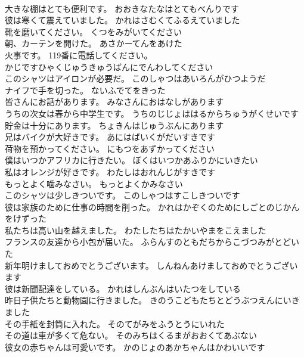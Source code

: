 \documentclass[8pt]{extreport}
\begin{document}
\begin{CJK}{UTF8}{min}
\\	大きな棚はとても便利です。	おおきなたなはとてもべんりです 
\\	彼は寒くて震えていました。	かれはさむくてふるえていました 
\\	靴を磨いてください。	くつをみがいてください 
\\	朝、カーテンを開けた。	あさかーてんをあけた 
\\	火事です。	119番に電話してください。 
\\	かじですひゃくじゅうきゅうばんにでんわしてください
\\	このシャツはアイロンが必要だ。	このしゃつはあいろんがひつようだ 
\\	ナイフで手を切った。	ないふでてをきった 
\\	皆さんにお話があります。	みなさんにおはなしがあります 
\\	うちの次女は春から中学生です。	うちのじじょははるからちゅうがくせいです 
\\	貯金は十分にあります。	ちょきんはじゅうぶんにあります 
\\	兄はバイクが大好きです。	あにはばいくがだいすきです 
\\	荷物を預かってください。	にもつをあずかってください 
\\	僕はいつかアフリカに行きたい。	ぼくはいつかあふりかにいきたい 
\\	私はオレンジが好きです。	わたしはおれんじがすきです 
\\	もっとよく噛みなさい。	もっとよくかみなさい 
\\	このシャツは少しきついです。	このしゃつはすこしきついです 
\\	彼は家族のために仕事の時間を削った。	かれはかぞくのためにしごとのじかんをけずった 
\\	私たちは高い山を越えました。	わたしたちはたかいやまをこえました 
\\	フランスの友達から小包が届いた。	ふらんすのともだちからこづつみがとどいた 
\\	新年明けましておめでとうございます。	しんねんあけましておめでとうございます 
\\	彼は新聞配達をしている。	かれはしんぶんはいたつをしている 
\\	昨日子供たちと動物園に行きました。	きのうこどもたちとどうぶつえんにいきました 
\\	その手紙を封筒に入れた。	そのてがみをふうとうにいれた 
\\	その道は車が多くて危ない。	そのみちはくるまがおおくてあぶない 
\\	彼女の赤ちゃんは可愛いです。	かのじょのあかちゃんはかわいいです 

\end{CJK}
\end{document}
